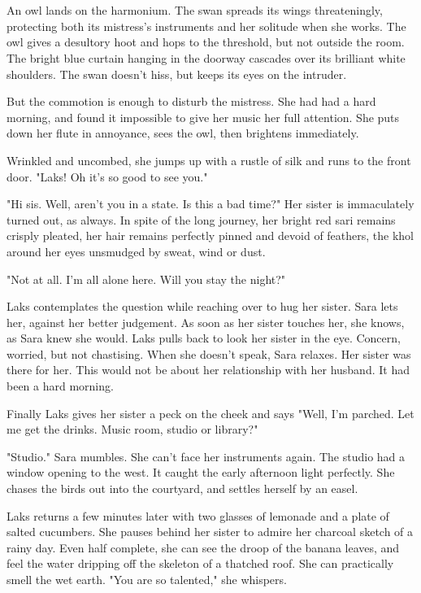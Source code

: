 \documentclass{article}
\begin{document}
\section{}
An owl lands on the harmonium. The swan spreads its wings threateningly, protecting both its mistress's instruments and her solitude when she works. The owl gives a desultory hoot and hops to the threshold, but not outside the room. The bright blue curtain hanging in the doorway cascades over its brilliant white shoulders. The swan doesn't hiss, but keeps its eyes on the intruder. 

But the commotion is enough to disturb the mistress. She had had a hard morning, and found it impossible to give her music her full attention. She puts down her flute in annoyance, sees the owl, then brightens immediately. 

Wrinkled and uncombed, she jumps up with a rustle of silk and runs to the front door. "Laks! Oh it’s so good to see you."

"Hi sis. Well, aren't you in a state. Is this a bad time?" Her sister is immaculately turned out, as always. In spite of the long journey, her bright red sari remains crisply pleated, her hair remains perfectly pinned and devoid of feathers, the khol around her eyes unsmudged by sweat, wind or dust. 

"Not at all. I'm all alone here. Will you stay the night?"

Laks contemplates the question while reaching over to hug her sister. Sara lets her, against her better judgement. As soon as her sister touches her, she knows, as Sara knew she would. Laks pulls back to look her sister in the eye. Concern, worried, but not chastising. When she doesn't speak, Sara relaxes. Her sister was there for her. This would not be about her relationship with her husband. It had been a hard morning.

Finally Laks gives her sister a peck on the cheek and says "Well, I'm parched. Let me get the drinks. Music room, studio or library?"

"Studio." Sara mumbles. She can't face her instruments again. The studio had a window opening to the west. It caught the early afternoon light perfectly. She chases the birds out into the courtyard, and settles herself by an easel.

Laks returns a few minutes later with two glasses of lemonade and a plate of salted cucumbers. She pauses behind her sister to admire her charcoal sketch of a rainy day. Even half complete, she can see the droop of the banana leaves, and feel the water dripping off the skeleton of a thatched roof. She can practically smell the wet earth. "You are so talented," she whispers.
\end{document}
